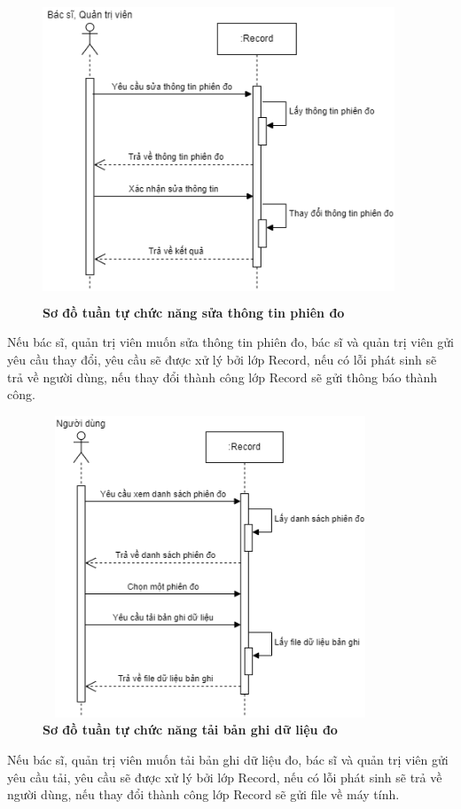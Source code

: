 \begin{figure}[H]
  \centering
  \includegraphics[width=10.5cm,height=9cm]{Images/sequence/sequence_manage_edit_record.png}
  \caption[Sơ đồ tuần tự chức năng sửa thông tin phiên đo]{\bfseries \fontsize{12pt}{0pt}
  \selectfont Sơ đồ tuần tự chức năng sửa thông tin phiên đo}
  \label{sequence_edit_record} %
\end{figure}
Nếu bác sĩ, quản trị viên muốn sửa thông tin phiên đo, bác sĩ và quản trị viên gửi yêu cầu thay đổi, yêu cầu sẽ được xử lý bởi lớp Record, 
nếu có lỗi phát sinh sẽ trả về người dùng, nếu thay đổi thành công lớp Record sẽ gửi thông báo thành công. 

\begin{figure}[H]
  \centering
  \includegraphics[width=10cm,height=9cm]{Images/sequence/sequence_download_records.png}
  \caption[Sơ đồ tuần tự chức năng tải bản ghi dữ liệu đo]{\bfseries \fontsize{12pt}{0pt}
  \selectfont Sơ đồ tuần tự chức năng tải bản ghi dữ liệu đo}
  \label{sequence_download_record} %
\end{figure}
Nếu bác sĩ, quản trị viên muốn tải bản ghi dữ liệu đo, bác sĩ và quản trị viên gửi yêu cầu tải, yêu cầu sẽ được xử lý bởi lớp Record, 
nếu có lỗi phát sinh sẽ trả về người dùng, nếu thay đổi thành công lớp Record sẽ gửi file về máy tính. 

